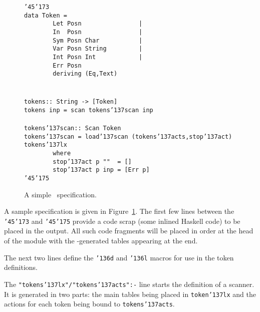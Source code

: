 \begin{figure}
{\mbox{\tt {\char'45}{\char'173}}\\
\mbox{\tt data\ Token\ =}\\
\mbox{\tt \ \ \ \ \ \ \ \ Let\ Posn\ \ \ \ \ \ \ \ \ \ \ \ \ \ \ \ |}\\
\mbox{\tt \ \ \ \ \ \ \ \ In\ \ Posn\ \ \ \ \ \ \ \ \ \ \ \ \ \ \ \ |}\\
\mbox{\tt \ \ \ \ \ \ \ \ Sym\ Posn\ Char\ \ \ \ \ \ \ \ \ \ \ |}\\
\mbox{\tt \ \ \ \ \ \ \ \ Var\ Posn\ String\ \ \ \ \ \ \ \ \ |}\\
\mbox{\tt \ \ \ \ \ \ \ \ Int\ Posn\ Int\ \ \ \ \ \ \ \ \ \ \ \ |}\\
\mbox{\tt \ \ \ \ \ \ \ \ Err\ Posn}\\
\mbox{\tt \ \ \ \ \ \ \ \ deriving\ (Eq,Text)}\\
\mbox{\tt }\\[-4pt]
\mbox{\tt }\\[-4pt]
\mbox{\tt tokens::\ String\ ->\ [Token]}\\
\mbox{\tt tokens\ inp\ =\ scan\ tokens{\char'137}scan\ inp}\\
\mbox{\tt }\\[-4pt]
\mbox{\tt tokens{\char'137}scan::\ Scan\ Token}\\
\mbox{\tt tokens{\char'137}scan\ =\ load{\char'137}scan\ (tokens{\char'137}acts,stop{\char'137}act)\ tokens{\char'137}lx}\\
\mbox{\tt \ \ \ \ \ \ \ \ where}\\
\mbox{\tt \ \ \ \ \ \ \ \ stop{\char'137}act\ p\ ""\ \ =\ []}\\
\mbox{\tt \ \ \ \ \ \ \ \ stop{\char'137}act\ p\ inp\ =\ [Err\ p]}\\
\mbox{\tt {\char'45}{\char'175}}
}
\caption{A simple \lx\ specification.}\label{fig-tokens}
\end{figure}

A sample specification is given in Figure~\ref{fig-tokens}.  The first few
lines between the \mbox{\tt {\char'45}{\char'173}} and \mbox{\tt {\char'45}{\char'175}} provide a code scrap (some inlined Haskell
code) to be placed in the output.  All such code fragments will be placed in
order at the head of the module with the \lx-generated tables appearing at the
end.

The next two lines define the \mbox{\tt {\char'136}d} and \mbox{\tt {\char'136}l} macros for use in the token
definitions.

The \mbox{\tt "tokens{\char'137}lx"/"tokens{\char'137}acts":-} line starts the definition of a scanner.  It
is generated in two parts: the main tables being placed in \mbox{\tt token{\char'137}lx} and the
actions for each token being bound to \mbox{\tt tokens{\char'137}acts}.

